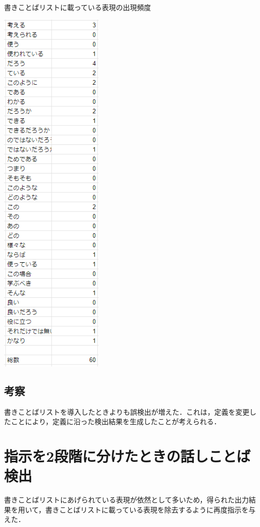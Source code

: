 \begin{table}[H]
	\centering
        \caption{書きことばリストに載っている表現の出現頻度}
 	\includegraphics[width=50mm]{image/kenshutu-ichiran-old.png}
	\label{kenshutu-ichiran-old}
\end{table}

\subsection{考察}
書きことばリストを導入したときよりも誤検出が増えた．これは，定義を変更したことにより，定義に沿った検出結果を生成したことが考えられる．

\section{指示を2段階に分けたときの話しことば検出 \label{c7s4}}
書きことばリストにあげられている表現が依然として多いため，得られた出力結果を用いて，書きことばリストに載っている表現を除去するように再度指示を与えた．

